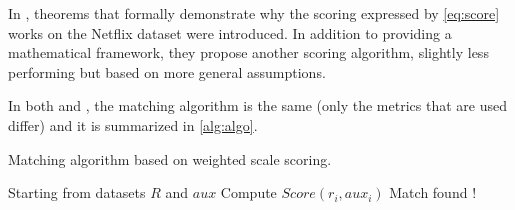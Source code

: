 In \cite{netflix-analytic}, theorems that formally demonstrate why the scoring expressed by \autoref{eq:score} works on the Netflix dataset were introduced. In addition to providing a mathematical framework, they propose another scoring algorithm, slightly less performing but based on more general assumptions.
 
%
%
%

In both \cite{netflix} and \cite{netflix-analytic}, the matching algorithm is the same (only the metrics that are used differ) and it is summarized in \autoref{alg:algo}.

\begin{algorithm}[h]
	\caption{Matching algorithm based on weighted scale scoring.}
	\label{alg:algo}
	\begin{algorithmic}[1]
		\State Starting from datasets $R$ and $aux$
		\newline
				\State Compute $Score(r_i,aux_i)$
					\State Match found !
				\EndIf
			\EndFor
		\EndFor
	\end{algorithmic}
\end{algorithm}


